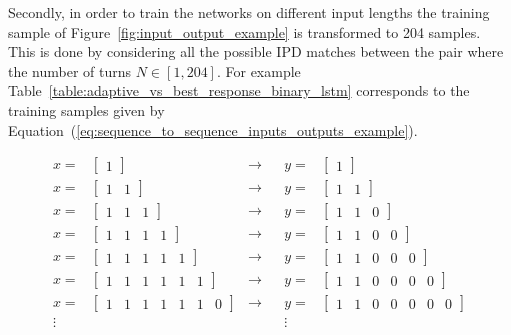 Secondly, in order to train the networks on different input lengths the training
sample of Figure~\ref{fig:input_output_example} is transformed to 204 samples.
This is done by considering all the possible IPD matches between
the pair where the number of turns \(N \in [1, 204]\). For example
Table~\ref{table:adaptive_vs_best_response_binary_lstm} corresponds to the
training samples given by Equation~(\ref{eq:sequence_to_sequence_inputs_outputs_example}).

\begin{align}\label{eq:sequence_to_sequence_inputs_outputs_example}
x = & \begin{bmatrix} 1 \end{bmatrix} &\to & & 
y = & \begin{bmatrix} 1 \end{bmatrix} \nonumber \\
x = & \begin{bmatrix} 1 & 1 \end{bmatrix} &\to & & 
y = & \begin{bmatrix} 1 & 1 \end{bmatrix} \nonumber \\
x = & \begin{bmatrix} 1 & 1 & 1 \end{bmatrix} &\to & & 
y = & \begin{bmatrix} 1 & 1 & 0 \end{bmatrix} \nonumber \\
x = & \begin{bmatrix} 1 & 1 & 1 & 1 \end{bmatrix} &\to & & 
y = & \begin{bmatrix} 1 & 1 & 0 & 0 \end{bmatrix} \\
x = & \begin{bmatrix} 1 & 1 & 1 & 1 & 1 \end{bmatrix} &\to & & 
y = & \begin{bmatrix} 1 & 1 & 0 & 0 & 0 \end{bmatrix} \nonumber \\
x = & \begin{bmatrix} 1 & 1 & 1 & 1 & 1 & 1\end{bmatrix} &\to & & 
y = & \begin{bmatrix} 1 & 1 & 0 & 0 & 0 & 0\end{bmatrix} \nonumber \\
x = & \begin{bmatrix} 1 & 1 & 1 & 1 & 1 & 1 & 0 \end{bmatrix} &\to & & 
y = & \begin{bmatrix} 1 & 1 & 0 & 0 & 0 & 0 & 0 \end{bmatrix} \nonumber \\
\vdots & & & & \vdots \nonumber
\end{align}

